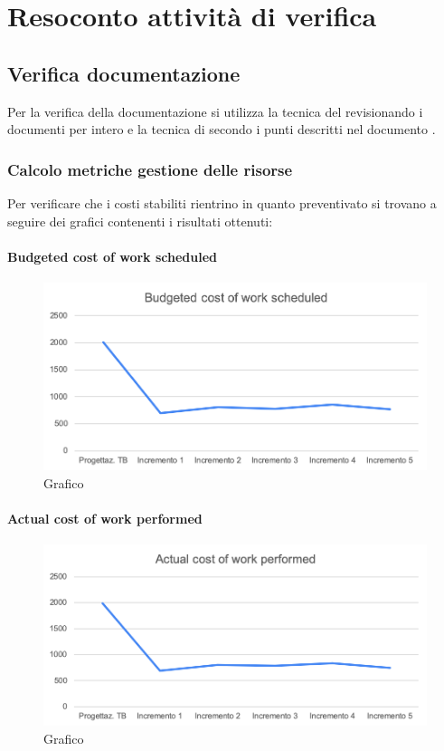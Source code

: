 \appendix
{}

\section{Resoconto attività di verifica}

\subsection{Verifica documentazione}
Per la verifica della documentazione si utilizza la tecnica del  revisionando i documenti per intero e la tecnica di  secondo i punti descritti nel documento .

\subsubsection{Calcolo metriche gestione delle risorse}
Per verificare che i costi stabiliti rientrino in quanto preventivato si trovano a seguire dei grafici contenenti i risultati ottenuti:

	\paragraph{Budgeted cost of work scheduled}
		\begin{figure}[H]
			\centering
			\includegraphics[width=0.8\linewidth]{./res/images/BCWS_1.png}
			\caption{Grafico }
			\label{fig:Grafico contenente il costo preventivato in Euro per fase}
		\end{figure}

	\paragraph{Actual cost of work performed}
		\begin{figure}[H]
			\centering
			\includegraphics[width=0.8\linewidth]{./res/images/ACWP_1.png}
			\caption{Grafico }
			\label{fig:Grafico contenente il costo effettivo in Euro per fase}
		\end{figure}

